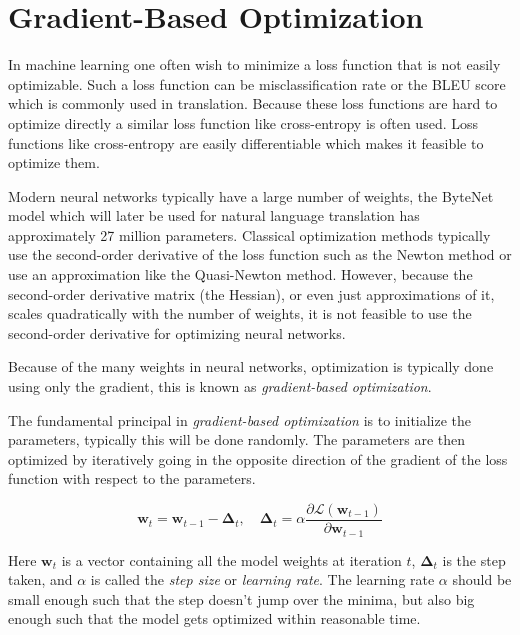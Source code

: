 \section{Gradient-Based Optimization}
\label{sec:theory:optimization}

In machine learning one often wish to minimize a loss function that is not easily optimizable. Such a loss function can be misclassification rate or the BLEU score which is commonly used in translation. Because these loss functions are hard to optimize directly a similar loss function like cross-entropy is often used. Loss functions like cross-entropy are easily differentiable which makes it feasible to optimize them.

Modern neural networks typically have a large number of weights, the ByteNet model which will later be used for natural language translation has approximately 27 million parameters. Classical optimization methods typically use the second-order derivative of the loss function such as the Newton method or use an approximation like the Quasi-Newton method. However, because the second-order derivative matrix (the Hessian), or even just approximations of it, scales quadratically with the number of weights, it is not feasible to use the second-order derivative for optimizing neural networks.

Because of the many weights in neural networks, optimization is typically done using only the gradient, this is known as \textit{gradient-based optimization}.

The fundamental principal in \textit{gradient-based optimization} is to initialize the parameters, typically this will be done randomly. The parameters are then optimized by iteratively going in the opposite direction of the gradient of the loss function with respect to the parameters.

\begin{equation}
\mathbf{w}_t = \mathbf{w}_{t-1} - {\boldsymbol\Delta}_t, \quad {\boldsymbol\Delta}_t = \alpha \frac{\partial \mathcal{L}(\mathbf{w}_{t-1})}{\partial \mathbf{w}_{t-1}}
\label{eq:theory:optimization:batch-optimization}
\end{equation}

Here $\mathbf{w}_t$ is a vector containing all the model weights at iteration $t$, ${\boldsymbol\Delta}_t$ is the step taken, and $\alpha$ is called the \textit{step size} or \textit{learning rate}. The learning rate $\alpha$ should be small enough such that the step doesn't jump over the minima, but also big enough such that the model gets optimized within reasonable time.


